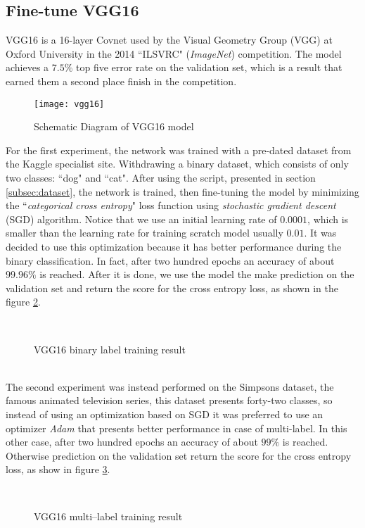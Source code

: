 \subsection{Fine-tune VGG16} 
\label{subsec:vgg16}
VGG16 is a 16-layer Covnet used by the Visual Geometry Group (VGG) at Oxford 
University in the 2014 ``ILSVRC" (\emph{ImageNet}) competition. 
The model achieves a $7.5\%$ top five error rate on the validation set, which 
is a result that earned them a second place finish in the competition.
%
\begin{figure}[htb]
\centering
\texttt{[image: vgg16]}
\caption{Schematic Diagram of VGG16 model}
\label{fig:vgg16schema}
\end{figure}
%
For the first experiment, the network was trained with a pre-dated dataset from 
the Kaggle specialist site. 
Withdrawing a binary dataset, which consists of only two classes: 
``dog" and ``cat".
After using the script, presented in section \ref {subsec:dataset}, the network
is trained, then fine-tuning the model by minimizing the ``\emph{categorical 
cross entropy}" loss function using \emph {stochastic gradient descent} (SGD) 
algorithm.
Notice that we use an initial learning
rate of $0.0001$, which is smaller than the learning rate for training scratch
model usually $0.01$.
It was decided to use this optimization because it has better performance 
during the binary classification.
In fact, after two hundred epochs an accuracy of about $99.96\%$ is reached. 
After it is done, we use the model the make prediction on the validation set 
and return the score for the cross entropy loss, as shown in the 
figure \ref{fig:vgg16resultbin}. \linebreak
\begin{figure}[htb]
\centering
{} \quad
{} \\
\caption{VGG16 binary label training result}
\label{fig:vgg16resultbin}
\end{figure}
%
\\The second experiment was instead performed on the Simpsons dataset, the famous 
animated television series, this dataset presents forty-two classes, so instead of 
using an optimization based on SGD it was preferred to use an optimizer 
\emph{Adam} that presents better performance in case of multi-label.
In this other case, after two hundred epochs an accuracy of about $99\%$ is 
reached.
Otherwise prediction on the validation set return the score for the cross 
entropy loss, as show in figure \ref{fig:vgg16resultmulti}.
%
\begin{figure}[htb]
\centering
{} \quad
{} \\
\caption{VGG16 multi--label training result}
\label{fig:vgg16resultmulti}
\end{figure}
%
